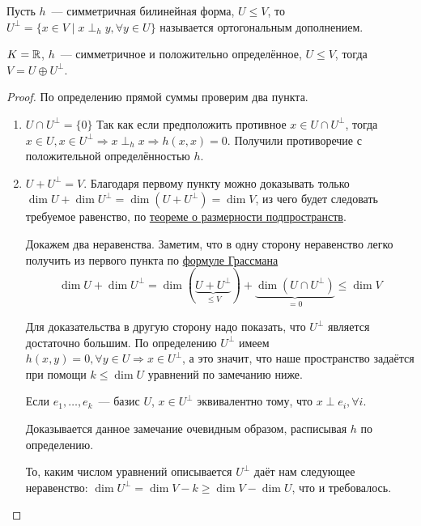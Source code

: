 \begin{definition}
    Пусть $h$~--- симметричная билинейная форма, $U\le V$, то $U^{\perp} = 
    \{x\in V \mid  x\perp_h y, \forall y \in U \}$ называется ортогональным дополнением.
\end{definition}
\begin{theorem}
    $K = \mathbb{R}$, $h$~--- симметричное и положительно определённое, $U \le V$,
    тогда $V = U \oplus U^{\perp}$.
\end{theorem}
\begin{proof}\leavevmode
    По определению прямой суммы проверим два пункта.
    \begin{enumerate}
        \item
        $U\cap U^{\perp} = \{0\}$
        Так как если предположить противное $x\in U \cap U^\perp$, тогда 
        $x \in U, x \in U^\perp \Rightarrow x \perp_{h} x \Rightarrow 
        h(x, x) = 0$. Получили противоречие с положительной определённостью $h$.
        \item 
        $U + U^\perp = V$. Благодаря первому пункту можно доказывать только
        $\dim U + \dim U^{\perp} = \dim (U + U^\perp) = \dim V$,
        из чего будет следовать требуемое равенство, по 
        \hyperref[thm:О размерности подпространств]{теореме о размерности подпространств}.

        Докажем два неравенства. Заметим, что в одну сторону неравенство легко получить
        из первого пункта по \hyperref[thm:Формула Грассмана]{формуле Грассмана} 
        \[
             \dim U + \dim U^{\perp} = \dim (\underbrace{U + U^\perp}_{\le V}) + \underbrace{\dim (U \cap U^\perp)}_{=0} \le \dim V
        \]

        Для доказательства в другую сторону надо показать, что $U^{\perp}$ является достаточно
        большим. По определению $U^\perp$ имеем $h(x, y) = 0, \forall y\in U \Rightarrow x\in U^\perp$, а это значит, что наше
        пространство задаётся при помощи $k \le \dim U$ уравнений по замечанию ниже.

        \begin{remark}
            Если $e_1,\dots, e_k$~--- базис $U$, 
            $x\in U^{\perp}$ эквивалентно тому, что $x \perp e_i, \forall i$.
        \end{remark}
        Доказывается данное замечание очевидным образом, расписывая $h$ по определению.

        То, каким числом уравнений описывается $U^\perp$ даёт нам следующее неравенство:
        $\dim U^{\perp} = \dim V - k \ge \dim V - \dim U$, что и требовалось.
    \end{enumerate}
\end{proof}
